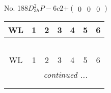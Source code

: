 \documentclass[fleqn,9pt,landscape]{jsarticle}
\begin{document}
\newpage
No. 188\quad$D_{3h}^{2}$\quad$P-6c2$\quad[ hexagonal ]\quad$+\begin{pmatrix} 0 & 0 & 0 \end{pmatrix}$
\begin{center}
\renewcommand{\arraystretch}{1.2}
\begin{longtable}{ccccccc}
 \hline \hline
WL & 1 & 2 & 3 & 4 & 5 & 6 \\ \hline \endfirsthead

\multicolumn{6}{l}{\tablename\ \thetable{}} \\
 \hline \hline
WL & 1 & 2 & 3 & 4 & 5 & 6 \\ \hline \endhead

 \hline \hline
\multicolumn{6}{r}{\footnotesize\it continued ...} \\ \endfoot

 \hline \hline
\multicolumn{6}{r}{} \\ \endlastfoot


\end{longtable}
\end{center}
\end{document}
